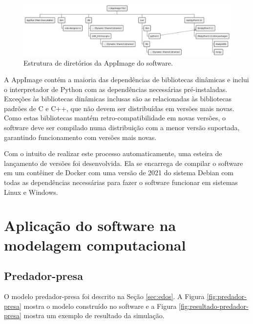 \documentclass[
	12pt,				%
	openright,			%
	oneside,			%
	a4paper,			%
	main=brazil,
	english,			%
	]{ufsj-abntex2}
\begin{document}
\begin{figure}[h]
    \centering
    \includegraphics[scale=0.37]{diagrams/img/appimage.png} 
    \caption{Estrutura de diretórios da AppImage do software.}
    \label{fig:appimage}
\end{figure}

A AppImage contém a maioria das dependências de bibliotecas dinâmicas e inclui o interpretador de Python com as dependências necessárias pré-instaladas. Exceções às bibliotecas dinâmicas inclusas são as relacionadas às bibliotecas padrões de C e C++, que não devem ser 
distribuídas em versões mais novas. Como estas bibliotecas mantém retro-compatibilidade em novas versões, o software deve ser compilado numa distribuição com a menor versão suportada, garantindo funcionamento com versões mais novas.

Com o intuito de realizar este processo automaticamente, uma esteira de lançamento de versões foi desenvolvida. Ela se encarrega de compilar o software em um contêiner de Docker \cite{merkel2014docker} com uma versão de 2021 do sistema Debian com todas as dependências necessárias para fazer o software funcionar em sistemas Linux e Windows. 

\chapter{Aplicação do software na modelagem computacional}
\label{chap:resultados}

\section{Predador-presa}

O modelo predador-presa foi descrito na Seção \ref{sec:edos}. A Figura \ref{fig:predador-presa} mostra o modelo construído no software e a Figura \ref{fig:resultado-predador-presa} mostra um exemplo de resultado da simulação. 
\end{document}
